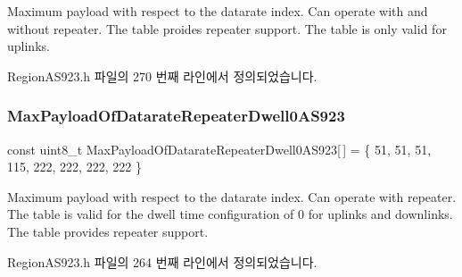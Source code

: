 Maximum payload with respect to the datarate index. Can operate with and without repeater. The table proides repeater support. The table is only valid for uplinks. 

Region\+A\+S923.\+h 파일의 270 번째 라인에서 정의되었습니다.

\mbox{\label{group___r_e_g_i_o_n_a_s923_gae64f6770c6c2c0a11eed56002ed3991a}} 
\subsubsection{\texorpdfstring{Max\+Payload\+Of\+Datarate\+Repeater\+Dwell0\+A\+S923}{MaxPayloadOfDatarateRepeaterDwell0AS923}}
{\footnotesize\ttfamily const uint8\+\_\+t Max\+Payload\+Of\+Datarate\+Repeater\+Dwell0\+A\+S923\mbox{[}$\,$\mbox{]} = \{ 51, 51, 51, 115, 222, 222, 222, 222 \}\hspace{0.3cm}{\ttfamily [static]}}

Maximum payload with respect to the datarate index. Can operate with repeater. The table is valid for the dwell time configuration of 0 for uplinks and downlinks. The table provides repeater support. 

Region\+A\+S923.\+h 파일의 264 번째 라인에서 정의되었습니다.

